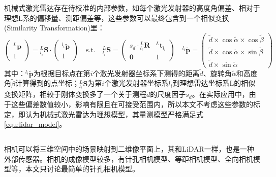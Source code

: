 机械式激光雷达存在待校准的内部参数，如每个激光发射器的高度角偏差、相对于理想L系的偏移量、测距偏差等，这些参数可以最终包含到一个相似变换(Similarity Transformation)里：
\begin{equation}
  \begin{pmatrix}
    {^{L}\boldsymbol{p}} \\1
  \end{pmatrix}={^{L}_{l_i}\boldsymbol{S}}\cdot
  \begin{pmatrix}
    {^{l_i}\widetilde{\boldsymbol{p}}} \\1
  \end{pmatrix}
  \quad\mathrm{s.t.}\quad
  {^{L}_{l_i}\boldsymbol{S}}=\begin{pmatrix}
    s_d\cdot{^{L}_{l_i}\boldsymbol{R}} & {^{L}\boldsymbol{t}_{l_i}} \\\boldsymbol{0}&1
  \end{pmatrix}\quad
  {^{l_i}\widetilde{\boldsymbol{p}}}=\begin{pmatrix}
    \widetilde{d}\times\cos\widetilde{\alpha}\times\cos\widetilde{\beta} \\
    \widetilde{d}\times\cos\widetilde{\alpha}\times\sin\widetilde{\beta} \\
    \widetilde{d}\times\sin\widetilde{\alpha}
  \end{pmatrix}
\end{equation}
其中：${^{l_i}\widetilde{\boldsymbol{p}}}$为根据目标点在第$i$个激光发射器坐标系下测得的距离$\widetilde{d}$、旋转角$\widetilde{\alpha}$和高度角$\widetilde{\beta}$计算得到的点坐标；${^{L}_{l_i}\boldsymbol{S}}$为第$i$个激光发射器坐标系$l_i$到理想雷达坐标系L的相似变换矩阵，相较于刚体变换多了一个关于测程$d$的尺度因子$s_d$。在实际应用中，由于这些偏差数值较小，影响有限且在可接受范围内，所以本文不考虑这些参数的标定，即认为机械式激光雷达为理想模型，其量测模型严格满足式\ref{equ:lidar_model}。

\subsection{}
相机可以将三维空间中的场景映射到二维像平面上，其和LiDAR一样，也是一种外部传感器。相机的成像模型较多，有针孔相机模型、等距相机模型、全向相机模型等，本文只讨论最简单的针孔相机模型。

